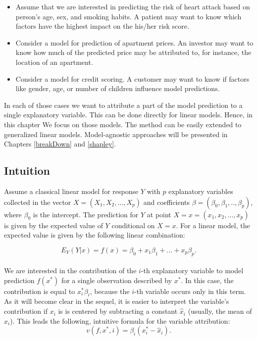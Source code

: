 \documentclass[12pt,]{krantz}
\providecommand{\tightlist}{%
  \setlength{\itemsep}{0pt}\setlength{\parskip}{0pt}}
\theoremstyle{definition}
\theoremstyle{definition}
\theoremstyle{definition}
\theoremstyle{remark}
\begin{document}
\begin{itemize}
\tightlist
\item
  Assume that we are interested in predicting the risk of heart attack
  based on person's age, sex, and smoking habits. A patient may want to
  know which factors have the highest impact on the his/her risk score.
\item
  Consider a model for prediction of apartment prices. An investor may
  want to know how much of the predicted price may be attributed to, for
  instance, the location of an apartment.
\item
  Consider a model for credit scoring. A customer may want to know if
  factors like gender, age, or number of children influence model
  predictions.
\end{itemize}

In each of those cases we want to attribute a part of the model
prediction to a single explanatory variable. This can be done directly
for linear models. Hence, in this chapter We focus on those models. The
method can be easily extended to generalized linear models.
Model-agnostic approaches will be presented in Chapters \ref{breakDown}
and \ref{shapley}.

\hypertarget{intuition-4}{%
\subsection{Intuition}\label{intuition-4}}

Assume a classical linear model for response \(Y\) with \(p\)
explanatory variables collected in the vector
\(X = (X_1, X_2, \ldots, X_p)\) and coefficients
\(\beta = (\beta_0, \beta_1, .., \beta_p)\), where \(\beta_0\) is the
intercept. The prediction for \(Y\) at point
\(X=x=(x_1, x_2, \ldots, x_p)\) is given by the expected value of \(Y\)
conditional on \(X=x\). For a linear model, the expected value is given
by the following linear combination:

\[
E_Y(Y | x) = f(x) = \beta_0 + x_1 \beta_1 + \ldots + x_p \beta_p.
\]\\
We are interested in the contribution of the \(i\)-th explanatory
variable to model prediction \(f(x^*)\) for a single observation
described by \(x^*\). In this case, the contribution is equal to
\(x^*_i\beta_i\), because the \(i\)-th variable occurs only in this
term. As it will become clear in the sequel, it is easier to interpret
the variable's contribution if \(x_i\) is is centered by subtracting a
constant \(\hat x_i\) (usually, the mean of \(x_i\)). This leads the
following, intuitive formula for the variable attribution: \[
v(f, x^*, i) = \beta_i (x_i^* - \hat x_i).
\]
\end{document}
